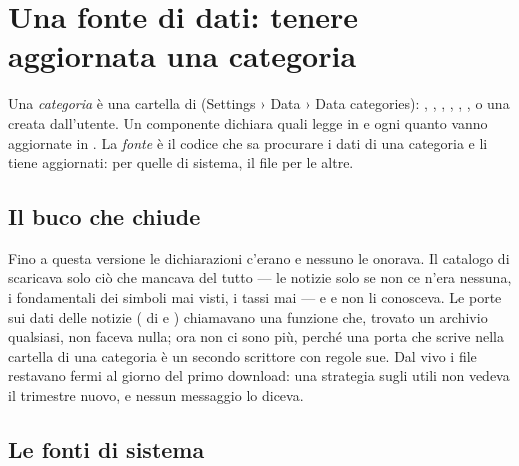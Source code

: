 \section{Una fonte di dati: tenere aggiornata una categoria}\label{sez:nuova-fonte}

Una \emph{categoria} è una cartella di \pkgDati{} (Settings › Data › Data
categories): , , , ,
, , o una creata dall'utente. Un componente dichiara
quali legge in  e ogni quanto vanno aggiornate
in . La \emph{fonte} è il codice che sa procurare i dati di
una categoria e li tiene aggiornati:  per quelle di
sistema, il file  per le altre.

\subsection{Il buco che chiude}

Fino a questa versione le dichiarazioni c'erano e nessuno le onorava. Il
catalogo di  scaricava solo ciò che mancava del
tutto --- le notizie solo se non ce n'era nessuna, i fondamentali dei simboli
mai visti, i tassi mai --- e  e  non li conosceva.
Le porte sui dati delle notizie ( di
 e ) chiamavano una funzione che,
trovato un archivio qualsiasi, non faceva nulla; ora non ci sono più, perché
una porta che scrive nella cartella di una categoria è un secondo scrittore
con regole sue. Dal vivo i file
restavano fermi al giorno del primo download: una strategia sugli utili non
vedeva il trimestre nuovo, e nessun messaggio lo diceva.

\subsection{Le fonti di sistema}

